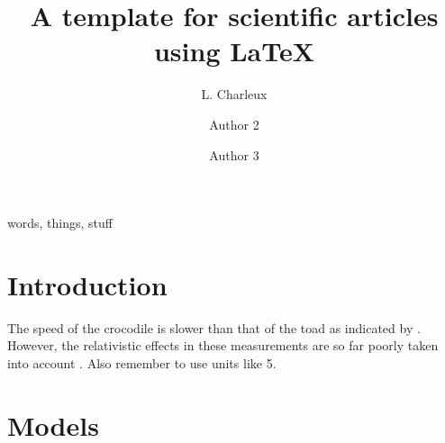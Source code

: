 \documentclass[12pt,5p, authoryear]{elsarticle}
\begin{document}
\begin{frontmatter}
\title{A template for scientific articles using \LaTeX}
\author[Univ1]{L. Charleux}
\author[Univ1]{Author 2}
\author[Univ1,Univ2]{Author 3}
\address[Univ1]{Univ1, univ. street, France}
\address[Univ2]{Univ2, univ. street, Australia}

\begin{abstract}

\blindtext[2]

\end{abstract}

\begin{keyword}
 words, things, stuff
\end{keyword}
\end{frontmatter}

\setcounter{footnote}{0}
\section{Introduction}

The speed of the crocodile is slower than that of the toad as indicated by \citet{arbey2012higgs}. 
However, the relativistic effects in these measurements are so far poorly taken into account \citep{hawking1974black, einstein1935PR}. 
Also remember to use units like \unit{5}\angstrom.
\blindtext[2]



\section{Models }
\blindtext[5]
\end{document}
